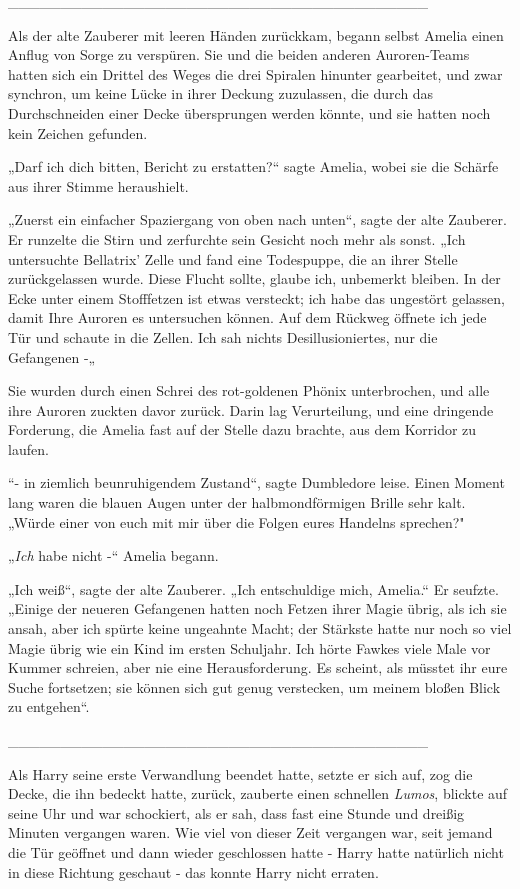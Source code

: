 {\_\_\_\_\_\_\_\_\_\_\_\_\_\_\_\_\_\_\_\_\_\_\_\_\_\_\_\_\_\_\_\_\_\_\_\_\_\_\_\_

Als der alte Zauberer mit leeren Händen zurückkam, begann selbst Amelia einen Anflug von Sorge zu verspüren. Sie und die beiden anderen Auroren-Teams hatten sich ein Drittel des Weges die drei Spiralen hinunter gearbeitet, und zwar synchron, um keine Lücke in ihrer Deckung zuzulassen, die durch das Durchschneiden einer Decke übersprungen werden könnte, und sie hatten noch kein Zeichen gefunden.

„Darf ich dich bitten, Bericht zu erstatten?“ sagte Amelia, wobei sie die Schärfe aus ihrer Stimme heraushielt.

„Zuerst ein einfacher Spaziergang von oben nach unten“, sagte der alte Zauberer. Er runzelte die Stirn und zerfurchte sein Gesicht noch mehr als sonst. „Ich untersuchte Bellatrix' Zelle und fand eine Todespuppe, die an ihrer Stelle zurückgelassen wurde. Diese Flucht sollte, glaube ich, unbemerkt bleiben. In der Ecke unter einem Stofffetzen ist etwas versteckt; ich habe das ungestört gelassen, damit Ihre Auroren es untersuchen können. Auf dem Rückweg öffnete ich jede Tür und schaute in die Zellen. Ich sah nichts Desillusioniertes, nur die Gefangenen -„

Sie wurden durch einen Schrei des rot-goldenen Phönix unterbrochen, und alle ihre Auroren zuckten davor zurück. Darin lag Verurteilung, und eine dringende Forderung, die Amelia fast auf der Stelle dazu brachte, aus dem Korridor zu laufen.

“- in ziemlich beunruhigendem Zustand“, sagte Dumbledore leise. Einen Moment lang waren die blauen Augen unter der halbmondförmigen Brille sehr kalt. „Würde einer von euch mit mir über die Folgen eures Handelns sprechen?"

„\emph{Ich} habe nicht -“ Amelia begann.

„Ich weiß“, sagte der alte Zauberer. „Ich entschuldige mich, Amelia.“ Er seufzte. „Einige der neueren Gefangenen hatten noch Fetzen ihrer Magie übrig, als ich sie ansah, aber ich spürte keine ungeahnte Macht; der Stärkste hatte nur noch so viel Magie übrig wie ein Kind im ersten Schuljahr. Ich hörte Fawkes viele Male vor Kummer schreien, aber nie eine Herausforderung. Es scheint, als müsstet ihr eure Suche fortsetzen; sie können sich gut genug verstecken, um meinem bloßen Blick zu entgehen“.

\_\_\_\_\_\_\_\_\_\_\_\_\_\_\_\_\_\_\_\_\_\_\_\_\_\_\_\_\_\_\_\_\_\_\_\_\_\_\_\_

Als Harry seine erste Verwandlung beendet hatte, setzte er sich auf, zog die Decke, die ihn bedeckt hatte, zurück, zauberte einen schnellen \emph{Lumos}, blickte auf seine Uhr und war schockiert, als er sah, dass fast eine Stunde und dreißig Minuten vergangen waren. Wie viel von dieser Zeit vergangen war, seit jemand die Tür geöffnet und dann wieder geschlossen hatte - Harry hatte natürlich nicht in diese Richtung geschaut - das konnte Harry nicht erraten.

}
